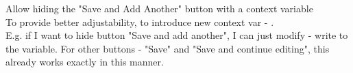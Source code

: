 Allow hiding the "Save and Add Another" button with a  context variable \\
To provide better adjustability, to introduce new context var - . \\
E.g. if I want to hide button "Save and add another", I can just modify  - write  to the variable.
For other buttons - "Save" and "Save and continue editing", this already works exactly in this manner.